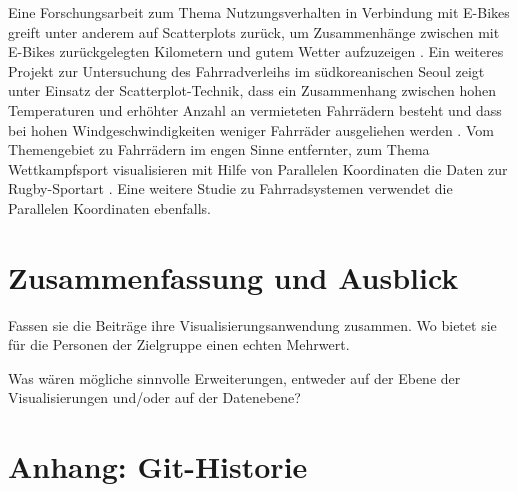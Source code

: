 \documentclass[usegeometry=true]{scrartcl}
\begin{document}
Eine Forschungsarbeit zum Thema Nutzungsverhalten in Verbindung mit E-Bikes greift unter anderem auf Scatterplots zurück, um Zusammenhänge zwischen mit E-Bikes zurückgelegten Kilometern und gutem Wetter aufzuzeigen \cite{Rios.06212016}. Ein weiteres Projekt zur Untersuchung des Fahrradverleihs im südkoreanischen Seoul zeigt unter Einsatz der Scatterplot-Technik, dass ein Zusammenhang zwischen hohen Temperaturen und erhöhter Anzahl an vermieteten Fahrrädern besteht und dass bei hohen Windgeschwindigkeiten weniger Fahrräder ausgeliehen werden \cite{Kashyap.2021}. Vom Themengebiet zu Fahrrädern im engen Sinne entfernter, zum Thema Wettkampfsport visualisieren mit Hilfe von Parallelen Koordinaten die Daten zur Rugby-Sportart \cite{Du.2021,Chung.2016}.
Eine weitere Studie zu Fahrradsystemen verwendet die Parallelen Koordinaten ebenfalls\cite{Shi.2018}.  
\section{Zusammenfassung und Ausblick}
Fassen sie die Beiträge ihre Visualisierungsanwendung zusammen. Wo bietet sie für die Personen der Zielgruppe einen echten Mehrwert.

Was wären mögliche sinnvolle Erweiterungen, entweder auf der Ebene der Visualisierungen und/oder auf der Datenebene?

\section*{Anhang: Git-Historie}
\newpage

\end{document}
